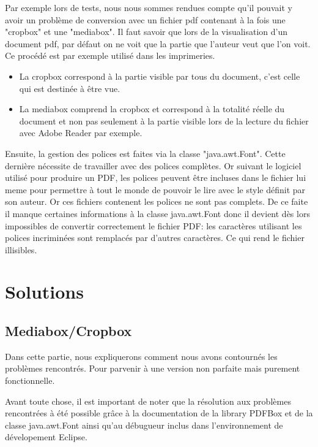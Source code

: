     Par exemple lors de tests, nous nous sommes rendues compte qu'il pouvait y 
    avoir un problème de conversion avec un fichier pdf contenant à la fois une 
    "cropbox" et une "mediabox". Il faut savoir que lors de la visualisation d'un 
    document pdf, par défaut on ne voit que la partie que l'auteur veut que l'on 
    voit. Ce procédé est par exemple utilisé dans les imprimeries. 

		\begin{itemize}
			\item La cropbox correspond  à la partie visible par tous du document, 
                  c'est celle qui est destinée à être vue.
			\item La mediabox comprend la cropbox et correspond à la totalité 
                  réelle du document et non pas seulement à la partie visible 
                  lors de la lecture du fichier avec Adobe Reader par exemple. 
		\end{itemize}

		Ensuite, la gestion des polices est faites via la classe "java.awt.Font".
    Cette dernière nécessite de travailler avec des polices complètes. Or suivant 
    le logiciel utilisé pour produire un PDF, les polices peuvent être incluses 
    dans le fichier lui meme pour permettre à tout le monde de pouvoir le lire avec 
	le style définit par son auteur. Or ces fichiers contenent les polices ne sont 
    pas complets. De ce faite il manque certaines informations à la classe java.awt.Font 
    donc il devient dès lors impossibles de convertir correctement le fichier PDF: 
    les caractères utilisant les polices incriminées sont remplacés par d'autres 
    caractères. Ce qui rend le fichier illisibles.

	\section{Solutions}
		\subsection{Mediabox/Cropbox}
	    Dans cette partie, nous expliquerons comment nous avons contournés les 
        problèmes rencontrés. Pour parvenir  à une version non parfaite mais 
        purement fonctionnelle.

	    Avant toute chose, il est important de noter que la résolution aux problèmes
        rencontrées à été possible grâce à la documentation de la library PDFBox 
        et de la classe java.awt.Font ainsi qu'au débugueur inclus dans l'environnement 
        de dévelopement Eclipse.	
    
